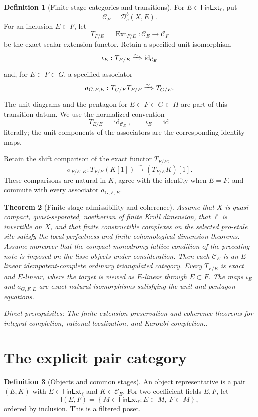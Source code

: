 \documentclass[10pt]{article}
\newtheorem{theorem}{Theorem}[section]
\theoremstyle{definition}
\newtheorem{definition}[theorem]{Definition}
\newcommand{\Dbc}{\mathcal D^b_c}
\newcommand{\depends}[1]{\par\smallskip\noindent\textit{Direct prerequisites:} #1.}
\begin{document}
\begin{definition}[Finite-stage categories and transitions]
\label{def:finite-stages}
For $E\in\mathsf{FinExt}_\ell$, put
\[
 \mathcal C_E=\Dbc(X,E).
\]
For an inclusion $E\subset F$, let
\[
 T_{F/E}=\operatorname{Ext}_{F/E}:
 \mathcal C_E\longrightarrow\mathcal C_F
\]
be the exact scalar-extension functor.  Retain a specified unit isomorphism
\[
 \iota_E:T_{E/E}\xRightarrow{\sim}\operatorname{id}_{\mathcal C_E}
\]
and, for $E\subset F\subset G$, a specified associator
\[
 a_{G,F,E}:T_{G/F}T_{F/E}\xRightarrow{\sim}T_{G/E}.
\]
The unit diagrams and the pentagon for $E\subset F\subset G\subset H$ are
part of this transition datum.  We use the normalized convention
\[
 T_{E/E}=\operatorname{id}_{\mathcal C_E},\qquad
 \iota_E=\operatorname{id}
\]
literally; the unit components of the associators are the corresponding
identity maps.

Retain the shift comparison of the exact functor $T_{F/E}$,
\[
 \sigma_{F/E,K}:T_{F/E}(K[1])
 \xrightarrow{\sim}(T_{F/E}K)[1].
\]
These comparisons are natural in $K$, agree with the identity when $E=F$,
and commute with every associator $a_{G,F,E}$.
\end{definition}

\begin{theorem}[Finite-stage admissibility and coherence]
\label{thm:finite-stage-coherence}
Assume that $X$ is quasi-compact, quasi-separated, noetherian of finite
Krull dimension, that $\ell$ is invertible on $X$, and that finite
constructible complexes on the selected pro-etale site satisfy the local
perfectness and finite-cohomological-dimension theorems.  Assume moreover
that the compact-monodromy lattice condition of the preceding note is
imposed on the lisse objects under consideration.  Then each
$\mathcal C_E$ is an $E$-linear idempotent-complete ordinary triangulated
category.  Every $T_{F/E}$ is exact and $E$-linear, where the target is
viewed as $E$-linear through $E\subset F$.  The maps $\iota_E$ and
$a_{G,F,E}$ are exact natural isomorphisms satisfying the unit and pentagon
equations.
\depends{The finite-extension preservation and coherence theorems for
integral completion, rational localization, and Karoubi completion.}
\end{theorem}

\section{The explicit pair category}

\begin{definition}[Objects and common stages]\label{def:pair-objects}
An object representative is a pair $(E,K)$ with
$E\in\mathsf{FinExt}_\ell$ and $K\in\mathcal C_E$.  For two coefficient
fields $E,F$, let
\[
 \mathsf I(E,F)=
 \left\{M\in\mathsf{FinExt}_\ell:E\subset M,\ F\subset M\right\},
\]
ordered by inclusion.  This is a filtered poset.
\end{definition}
\end{document}
